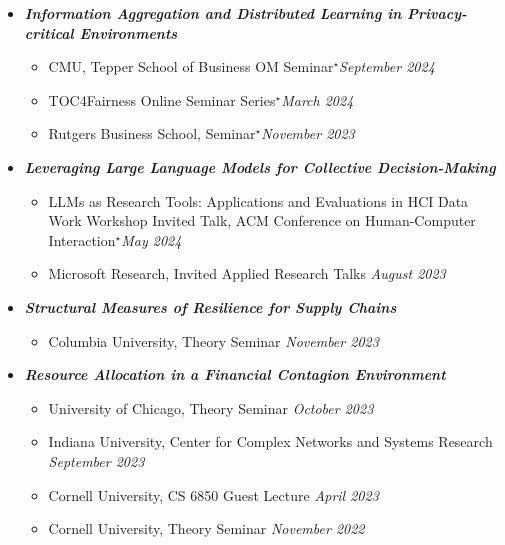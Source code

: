 \documentclass[margin]{res}
\newcommand{\presentedbycoauthor}[0]{\ensuremath {^{\star}}}
\newcommand{\bemph}[1]{\textbf{\emph{#1}}}
\begin{document}
\begin{resume}
\begin{itemize}[nosep]
	\item \bemph{Information Aggregation and Distributed Learning in Privacy-critical Environments}
	\begin{itemize}[nosep]
	\item CMU, Tepper School of Business OM Seminar\presentedbycoauthor \hfill \emph{September 2024}
	\item  TOC4Fairness Online Seminar Series\presentedbycoauthor \hfill \emph{March 2024}
	\item Rutgers Business School, Seminar\presentedbycoauthor \hfill \emph{November 2023}	
	\end{itemize}

	\item \bemph{Leveraging Large Language Models for Collective Decision-Making}
	\begin{itemize}[nosep]
		\item LLMs as Research Tools: Applications and Evaluations in HCI Data Work Workshop Invited Talk, ACM Conference on Human-Computer Interaction\presentedbycoauthor \hfill \emph{May 2024}
		\item Microsoft Research, Invited Applied Research Talks \hfill \emph{August 2023}
	\end{itemize}

	\item \bemph{Structural Measures of Resilience for Supply Chains}
	\begin{itemize}[nosep]
		\item Columbia University, Theory Seminar \hfill \emph{November 2023}
	\end{itemize}

	\item \bemph{Resource Allocation in a Financial Contagion Environment}
	\begin{itemize}[nosep]
		\item University of Chicago, Theory Seminar \hfill \emph{October 2023}
		\item Indiana University, Center for Complex Networks and Systems Research \\ \hfill \emph{September 2023} 
		\item Cornell University, CS 6850 Guest Lecture \hfill \emph{April 2023}
		\item Cornell University, Theory Seminar \hfill \emph{November 2022}
	\end{itemize}
	

\end{itemize}
\end{resume}
\end{document}
